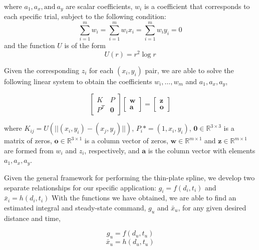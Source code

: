 \documentclass[letterpaper, 10 pt, conference]{ieeeconf}  %
\begin{document}
where $a_1,a_x,\text{and}~a_y$ are scalar coefficients, $w_i$ is a coefficient that corresponds to each specific trial, subject to the following condition: \begin{equation}
\sum_{i=1}^mw_i=\sum_{i=1}^mw_ix_i=\sum_{i=1}^mw_iy_i=0
\end{equation}
and the function $U$ is of the form
\begin{equation}
  U(r) = r^2\log{r} 
\end{equation}

Given the corresponding $z_i$ for each $(x_i,y_i)$ pair, we are able to solve the following linear system to obtain the coefficients $w_i,\ldots,w_m$ and $a_1,a_x,a_y$,

\begin{equation}
    \begin{bmatrix}
    K&P\\
    P^T& \mathbf{0}
    \end{bmatrix}
    \begin{bmatrix}
    \mathbf{w}\\
    \mathbf{a}
    \end{bmatrix} = 
    \begin{bmatrix}
    \mathbf{z}\\
    \mathbf{o}
    \end{bmatrix}
\end{equation}

where $K_{ij} = U(||(x_i,y_i)-(x_j,y_j)||)$, $P_i* = (1,x_i,y_i)$, $\mathbf{0}  \in \mathbb{R}^{3\times3}$ is a matrix of zeros, $\mathbf{o} \in \mathbb{R}^{3\times1}$ is a column vector of zeros, $\mathbf{w} \in \mathbb{R}^{m\times1}$ and $\mathbf{z} \in \mathbb{R}^{m\times1}$ are formed from $w_i$ and $z_i$, respectively, and $\mathbf{a}$ is the column vector with elements $a_1,a_x,a_y$.

Given the general framework for performing the thin-plate spline, we develop two separate relationships for our specific application: $g_i = f(d_i,t_i)$ and $\bar{x}_i = h(d_i,t_i)$
With the functions we have obtained, we are able to find an estimated integral and steady-state command, $g_u$ and $\bar{x}_u$, for any given desired distance and time,

\begin{equation} \label{eq:integralfit}
g_u = f(d_u,t_u)
\end{equation}
\begin{equation} \label{eq:ssvelfit}
\bar{x}_u = h(d_u,t_u)
\end{equation}
\end{document}
